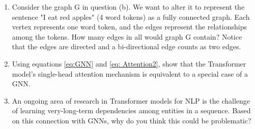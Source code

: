 \begin{enumerate}[resume]
    \item Consider the graph G in question (b). We want to alter it to represent the sentence "I eat red apples" (4 word tokens) as a fully connected graph. Each vertex represents one word token, and the edges represent the relationships among the tokens. How many edges in all would graph G contain? Notice that the edges are directed and a bi-directional edge counts as two edges.
    \item Using equations \ref{eq:GNN} and \ref{eq: Attention2}, show that the Transformer model's single-head attention mechanism is equivalent to a special case of a GNN. 
    \item An ongoing area of research in Transformer models for NLP is the challenge of learning very-long-term dependencies among entities in a sequence. Based on this connection with GNNs, why do you think this could be problematic? 
\end{enumerate}
